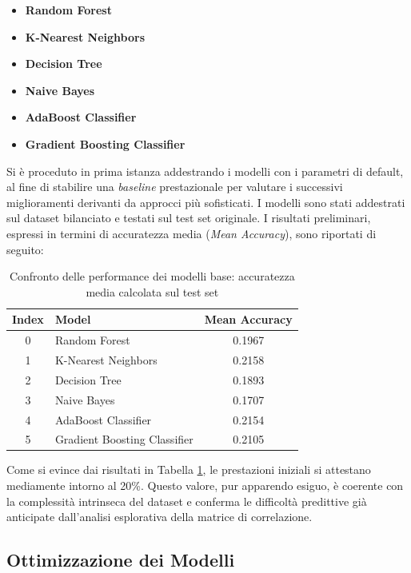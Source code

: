 \begin{itemize}
    \item \textbf{Random Forest}
    \item \textbf{K-Nearest Neighbors}
    \item \textbf{Decision Tree}
    \item \textbf{Naive Bayes}
    \item \textbf{AdaBoost Classifier}
    \item \textbf{Gradient Boosting Classifier}
\end{itemize}

Si è proceduto in prima istanza addestrando i modelli con i parametri di default, al fine di stabilire una \textit{baseline} prestazionale per valutare i successivi miglioramenti derivanti da approcci più sofisticati. I modelli sono stati addestrati sul dataset bilanciato e testati sul test set originale. I risultati preliminari, espressi in termini di accuratezza media (\textit{Mean Accuracy}), sono riportati di seguito:

\begin{table}[H]
    \centering
    \begin{tabular}{|c|l|c|}
    \hline
    \textbf{Index} & \textbf{Model} & \textbf{Mean Accuracy} \\ \hline
    0 & Random Forest & 0.1967 \\ \hline
    1 & K-Nearest Neighbors & 0.2158 \\ \hline
    2 & Decision Tree & 0.1893 \\ \hline
    3 & Naive Bayes & 0.1707 \\ \hline
    4 & AdaBoost Classifier & 0.2154 \\ \hline
    5 & Gradient Boosting Classifier & 0.2105 \\ \hline
    \end{tabular}
    \caption{Confronto delle performance dei modelli base: accuratezza media calcolata sul test set}
    \label{tab:modelli_base}
\end{table}

Come si evince dai risultati in Tabella \ref{tab:modelli_base}, le prestazioni iniziali si attestano mediamente intorno al 20\%. Questo valore, pur apparendo esiguo, è coerente con la complessità intrinseca del dataset e conferma le difficoltà predittive già anticipate dall'analisi esplorativa della matrice di correlazione.

\subsection{Ottimizzazione dei Modelli}

